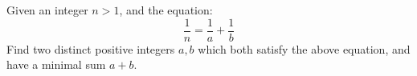 

Given an integer $n>1$, and the equation: $$ \frac{1}{n}=\frac{1}{a}+
\frac{1}{b}$$ Find two distinct positive integers $a,b$ which both satisfy the
above equation, and have a minimal sum $a+b$.


